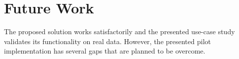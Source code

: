 \documentclass[a4paper,twoside]{article}
\begin{document}
%



\section{Future Work}

The proposed solution works satisfactorily and the presented use-case study validates its functionality on real data. However, the presented pilot implementation has several gaps that are planned to be overcome.
\end{document}
